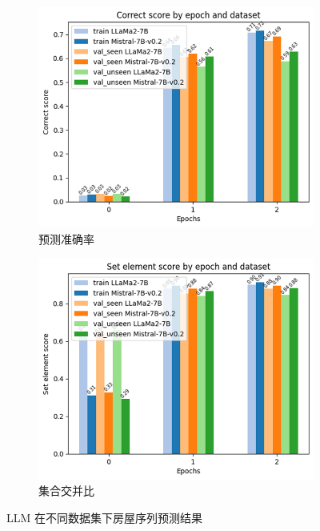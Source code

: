 \documentclass[bachelor]{thesis-uestc}
\begin{document}
\begin{figure}[htbp]
    \centering  %
    \begin{subfigure}[b]{0.48\textwidth}
        \centering    %
        \includegraphics[width=\textwidth]{2201-042817.png} %
        \caption{预测准确率}
        \label{fig:sub1}
    \end{subfigure}
    \hfill %
    \begin{subfigure}[b]{0.48\textwidth} 
        \centering    %
        \includegraphics[width=\textwidth]{1630-052114.png}
        \caption{集合交并比}
        \label{fig:sub2}
    \end{subfigure}
    \caption{LLM 在不同数据集下房屋序列预测结果}    %
    \label{room_pred}    %
\end{figure}
\end{document}
